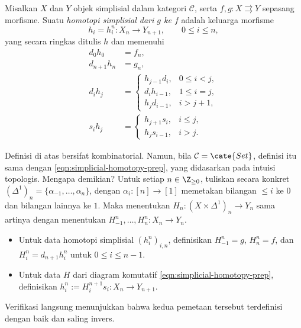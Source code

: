 \begin{definition}\label{def:simplicial-homotopy}
	Misalkan $X$ dan $Y$ objek simplisial dalam kategori $\mathcal{C}$, serta
	$f,g:X\rightrightarrows Y$ sepasang morfisme. Suatu
	\emph{homotopi simplisial dari $g$ ke $f$} adalah keluarga morfisme
	\[
	h_i=h_i^n:X_n\to Y_{n+1},\qquad0\leq i\leq n,
	\]
	yang secara ringkas ditulis $h$ dan memenuhi
	\begin{align*}
		d_0h_0&=f_n,\\
		d_{n+1}h_n&=g_n,\\
		d_ih_j&=
		\begin{cases}
			h_{j-1}d_i,&0\leq i<j,\\
			d_ih_{i-1},&1\leq i=j,\\
			h_jd_{i-1},&i>j+1,
		\end{cases}\\
		s_ih_j&=
		\begin{cases}
			h_{j+1}s_i,&i\leq j,\\
			h_js_{i-1},&i>j.
		\end{cases}
	\end{align*}
\end{definition}

Definisi di atas bersifat kombinatorial. Namun, bila
$\mathcal{C}=\cate{Set}$, definisi itu sama dengan
\eqref{eqn:simplicial-homotopy-prep}, yang didasarkan pada intuisi topologis.
Mengapa demikian? Untuk setiap $n\in\Z_{\geq0}$, tuliskan secara konkret
$(\Delta^1)_n=\{\alpha_{-1},\ldots,\alpha_n\}$, dengan
$\alpha_i:[n]\to[1]$ memetakan bilangan $\leq i$ ke $0$ dan bilangan lainnya
ke $1$. Maka menentukan $H_n:(X\times\Delta^1)_n\to Y_n$ sama artinya dengan
menentukan $H_{-1}^n,\ldots,H_n^n:X_n\to Y_n$.
\begin{itemize}
	\item Untuk data homotopi simplisial $(h_i^n)_{i,n}$, definisikan
	$H_{-1}^n=g$, $H_n^n=f$, dan
	$H_i^n=d_{n+1}h_i^n$ untuk $0\leq i\leq n-1$.
	\item Untuk data $H$ dari diagram komutatif
	\eqref{eqn:simplicial-homotopy-prep}, definisikan
	$h_i^n:=H_i^{n+1}s_i:X_n\to Y_{n+1}$.
\end{itemize}
Verifikasi langsung menunjukkan bahwa kedua pemetaan tersebut terdefinisi
dengan baik dan saling invers.

